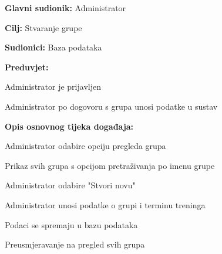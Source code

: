 \documentclass[times, utf8, zavrsni]{fer}
\newenvironment{packed_enum}{
	\begin{enumerate}
		\setlength{\itemsep}{0pt}
		\setlength{\parskip}{0pt}
		\setlength{\parsep}{0pt}
	}{\end{enumerate}}
\newenvironment{packed_item}{
	\begin{itemize}
		\setlength{\itemsep}{0pt}
		\setlength{\parskip}{0pt}
		\setlength{\parsep}{0pt}
	}{\end{itemize}}
\begin{document}
			\noindent {}
					\begin{packed_item}
						
						\item \textbf{Glavni sudionik: } Administrator
						\item  \textbf{Cilj:} Stvaranje grupe
						\item  \textbf{Sudionici:} Baza podataka
						\item  \textbf{Preduvjet:} 
						
						\item[] \begin{packed_enum}
							
							\item Administrator je prijavljen
							\item Administrator po dogovoru s grupa unosi podatke u sustav
							
							
						\end{packed_enum}
						
						\item  \textbf{Opis osnovnog tijeka događaja:}
						
						\item[] \begin{packed_enum}
							
							\item Administrator odabire opciju pregleda grupa
							\item Prikaz svih grupa s opcijom pretraživanja po imenu grupe
							\item Administrator odabire "Stvori novu"
							\item Administrator unosi podatke o grupi i terminu treninga
							\item Podaci se spremaju u bazu podataka
							\item Preusmjeravanje na pregled svih grupa
							
							
						\end{packed_enum}
						
					\end{packed_item}
					
\end{document}
